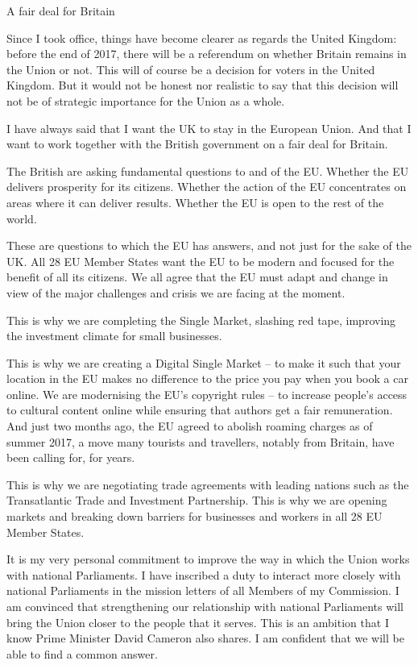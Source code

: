 \documentclass[a4paper,11pt]{article}
\begin{document}
 

A fair deal for Britain

Since I took office, things have become clearer as regards the United Kingdom: before the end of 2017, there will be a referendum on whether Britain remains in the Union or not. This will of course be a decision for voters in the United Kingdom. But it would not be honest nor realistic to say that this decision will not be of strategic importance for the Union as a whole.

I have always said that I want the UK to stay in the European Union. And that I want to work together with the British government on a fair deal for Britain.

The British are asking fundamental questions to and of the EU. Whether the EU delivers prosperity for its citizens. Whether the action of the EU concentrates on areas where it can deliver results. Whether the EU is open to the rest of the world.

These are questions to which the EU has answers, and not just for the sake of the UK. All 28 EU Member States want the EU to be modern and focused for the benefit of all its citizens. We all agree that the EU must adapt and change in view of the major challenges and crisis we are facing at the moment.

This is why we are completing the Single Market, slashing red tape, improving the investment climate for small businesses.

This is why we are creating a Digital Single Market – to make it such that your location in the EU makes no difference to the price you pay when you book a car online. We are modernising the EU's copyright rules – to increase people's access to cultural content online while ensuring that authors get a fair remuneration. And just two months ago, the EU agreed to abolish roaming charges as of summer 2017, a move many tourists and travellers, notably from Britain, have been calling for, for years.

This is why we are negotiating trade agreements with leading nations such as the Transatlantic Trade and Investment Partnership. This is why we are opening markets and breaking down barriers for businesses and workers in all 28 EU Member States.

It is my very personal commitment to improve the way in which the Union works with national Parliaments. I have inscribed a duty to interact more closely with national Parliaments in the mission letters of all Members of my Commission. I am convinced that strengthening our relationship with national Parliaments will bring the Union closer to the people that it serves. This is an ambition that I know Prime Minister David Cameron also shares. I am confident that we will be able to find a common answer.
\end{document}
